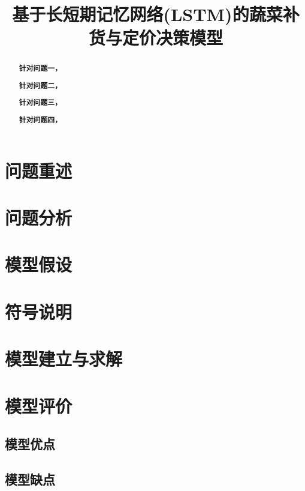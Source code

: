 \documentclass[withoutpreface,bwprint]{cumcmthesis} %
\title{基于长短期记忆网络(LSTM)的蔬菜补货与定价决策模型}
\begin{document}
\maketitle
\nocite{*}


\begin{abstract}

    \textbf{针对问题一，}

    \textbf{针对问题二，}

    \textbf{针对问题三，}

    \textbf{针对问题四，}

    \keywords{}
\end{abstract}

\section{问题重述}

\section{问题分析}


\section{模型假设}




\section{符号说明}


\section{模型建立与求解}


\section{模型评价}
\subsection{模型优点}

\subsection{模型缺点}




\begin{appendices}
\end{appendices}
\end{document}
